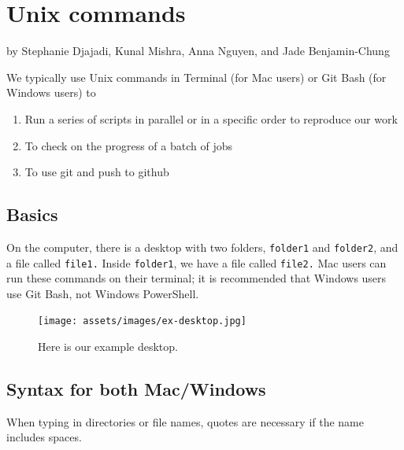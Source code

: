 \documentclass[
]{book}
\providecommand{\tightlist}{%
  \setlength{\itemsep}{0pt}\setlength{\parskip}{0pt}}
\begin{document}
\chapter{Unix commands}\label{unix}

by Stephanie Djajadi, Kunal Mishra, Anna Nguyen, and Jade Benjamin-Chung

We typically use Unix commands in Terminal (for Mac users) or Git Bash (for Windows users) to

\begin{enumerate}
\def\labelenumi{\arabic{enumi}.}
\tightlist
\item
  Run a series of scripts in parallel or in a specific order to reproduce our work
\item
  To check on the progress of a batch of jobs
\item
  To use git and push to github
\end{enumerate}

\section{Basics}\label{basics-1}

On the computer, there is a desktop with two folders, \texttt{folder1} and \texttt{folder2}, and a file called \texttt{file1.} Inside \texttt{folder1}, we have a file called \texttt{file2.} Mac users can run these commands on their terminal; it is recommended that Windows users use Git Bash, not Windows PowerShell.

\begin{figure}
\centering
\texttt{[image: assets/images/ex-desktop.jpg]}
\caption{Here is our example desktop.}
\end{figure}

\section{Syntax for both Mac/Windows}\label{syntax-for-both-macwindows}

When typing in directories or file names, quotes are necessary if the name includes spaces.
\end{document}

